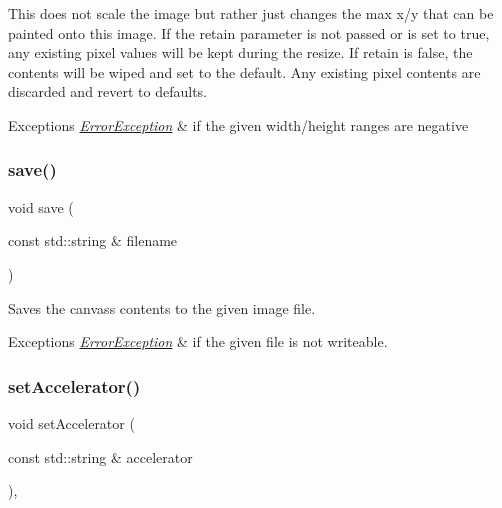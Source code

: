 This does not scale the image but rather just changes the max x/y that can be painted onto this image. If the \textquotesingle{}retain\textquotesingle{} parameter is not passed or is set to true, any existing pixel values will be kept during the resize. If \textquotesingle{}retain\textquotesingle{} is false, the contents will be wiped and set to the default. Any existing pixel contents are discarded and revert to defaults. 
\begin{DoxyExceptions}{Exceptions}
{\em \mbox{\hyperlink{classErrorException}{Error\+Exception}}} & if the given width/height ranges are negative \\
\hline
\end{DoxyExceptions}
\mbox{\label{classGCanvas_a2c027edbcd25b820dc6e21a9a3ad0496}} 
\subsubsection{\texorpdfstring{save()}{save()}}
{\footnotesize\ttfamily void save (\begin{DoxyParamCaption}\item[{const std\+::string \&}]{filename }\end{DoxyParamCaption})\hspace{0.3cm}{\ttfamily [virtual]}}



Saves the canvas\textquotesingle{}s contents to the given image file. 


\begin{DoxyExceptions}{Exceptions}
{\em \mbox{\hyperlink{classErrorException}{Error\+Exception}}} & if the given file is not writeable. \\
\hline
\end{DoxyExceptions}
\mbox{\label{classGInteractor_ad15f102f62e2960576012f1aa0ba4b2e}} 
\subsubsection{\texorpdfstring{set\+Accelerator()}{setAccelerator()}}
{\footnotesize\ttfamily void set\+Accelerator (\begin{DoxyParamCaption}\item[{const std\+::string \&}]{accelerator }\end{DoxyParamCaption})\hspace{0.3cm}{\ttfamily [virtual]}, {\ttfamily [inherited]}}



